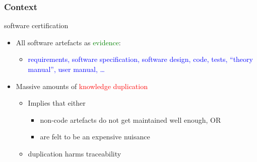 \documentclass{beamer}
\begin{document}
\begin{frame}
\frametitle{Context}
{\Large software certification}
\vspace*{.2cm}
\begin{itemize}
\item<3->All software artefacts as \textcolor{green}{evidence}:
\begin{itemize}
\item \textcolor{blue}{requirements, software specification, software design, code, 
  tests, ``theory manual'', user manual, \ldots}
\end{itemize}
\vspace*{.5cm}
\item<4->Massive amounts of \textcolor{red}{knowledge duplication}
\begin{itemize}
  \item Implies that either
  \begin{itemize}
    \item non-code artefacts do not get maintained well enough, OR
    \item are felt to be an expensive nuisance
  \end{itemize}
  \item duplication harms traceability
\end{itemize}
\end{itemize}
\vfill
\end{frame}

\begin{frame}
  \frametitle{Example (GlassBR)
(see documents and code)
\end{frame}

% 
% 
\end{document}
